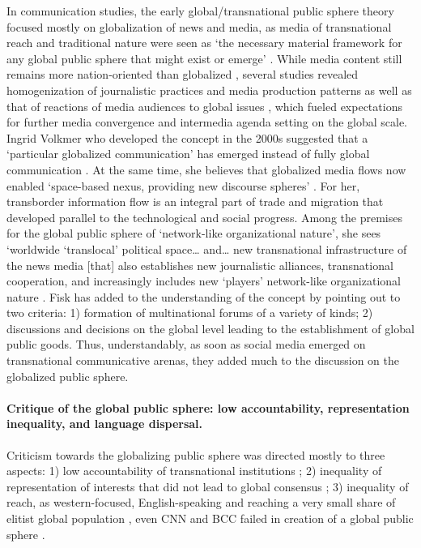 In communication studies, the early global/transnational public sphere theory focused mostly on globalization of news and media, as media of transnational reach and traditional nature were seen as ‘the necessary material framework for any global public sphere that might exist or emerge’ \cite[p.~76]{Sparks2001}. While media content still remains more nation-oriented than globalized \cite{Hafez,Hafez2007,Berglez,WilkeHeimprechtCohen}, several studies revealed homogenization of journalistic practices and media production patterns as well as that of reactions of media audiences to global issues \cite{Cottle2011,Du,CurranEsserHallin}, which fueled expectations for further media convergence and intermedia agenda setting on the global scale. Ingrid Volkmer who developed the concept in the 2000s suggested that a ‘particular globalized communication’ has emerged instead of fully global communication \cite[p.~58]{Volkmer}. At the same time, she believes that globalized media flows now enabled ‘space-based nexus, providing new discourse spheres’ \cite[p.~61]{Volkmer}. For her, transborder information flow is an integral part of trade and migration that developed parallel to the technological and social progress. Among the premises for the global public sphere of ‘network-like organizational nature’, she sees ‘worldwide ‘translocal’ political space… and… new transnational infrastructure of the news media [that] also establishes new journalistic alliances, transnational cooperation, and increasingly includes new ‘players’ network-like organizational nature \cite[p.~12--13]{Volkmer2003}. Fisk \cite{Fisk} has added to the understanding of the concept by pointing out to two criteria: 1) formation of multinational forums of a variety of kinds; 2) discussions and decisions on the global level leading to the establishment of global public goods. Thus, understandably, as soon as social media emerged on transnational communicative arenas, they added much to the discussion on the globalized public sphere.

\paragraph{Critique of the global public sphere: low accountability, representation inequality, and language dispersal.} Criticism towards the globalizing public sphere was directed mostly to three aspects: 1) low accountability of transnational institutions \cite[p.~34]{Sparks2005}; 2) inequality of representation of interests that did not lead to global consensus \cite{Sparks2001,Fuchs2014}; 3) inequality of reach, as western-focused, English-speaking and reaching a very small share of elitist global population \cite{Docherty}, even CNN and BCC failed in creation of a global public sphere \cite{Sparks1998,Sparks2003}.

